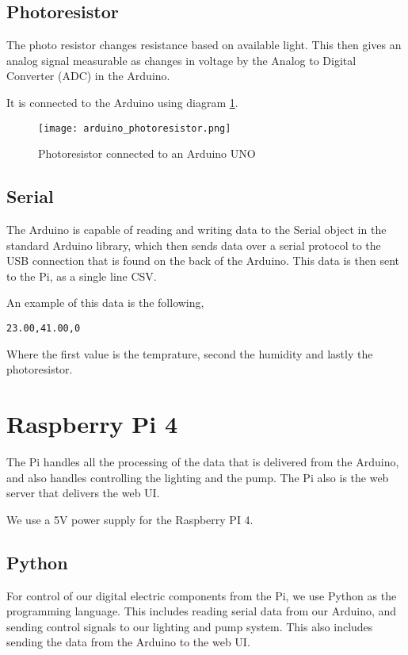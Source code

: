 \documentclass[12pt,a4paper,oneside]{book}
\begin{document}
\subsection{Photoresistor}
The photo resistor changes resistance based on available light.
This then gives an analog signal measurable as changes in voltage by the Analog to Digital Converter (ADC) in the Arduino.

It is connected to the Arduino using diagram \ref{diagram2}.

\begin{figure}[h]
    \texttt{[image: arduino\_photoresistor.png]}
    \caption{Photoresistor connected to an Arduino UNO \cite{photoresistor_arduino}}
    \label{diagram2}
\end{figure}

\subsection{Serial}
The Arduino is capable of reading and writing data to the Serial object in the standard Arduino library, which then sends data over a serial protocol to the USB connection that is found on the back of the Arduino.
This data is then sent to the Pi, as a single line CSV.

An example of this data is the following,
\begin{verbatim}
23.00,41.00,0
\end{verbatim}

Where the first value is the temprature, second the humidity and lastly the photoresistor.

\section{Raspberry Pi 4}
The Pi handles all the processing of the data that is delivered from the Arduino, and also handles controlling the lighting and the pump.
The Pi also is the web server that delivers the web UI.

We use a 5V power supply for the Raspberry PI 4.

\subsection{Python}
For control of our digital electric components from the Pi, we use Python as the programming language.
This includes reading serial data from our Arduino, and sending control signals to our lighting and pump system. This also includes sending the data from the Arduino to the web UI.
\end{document}
